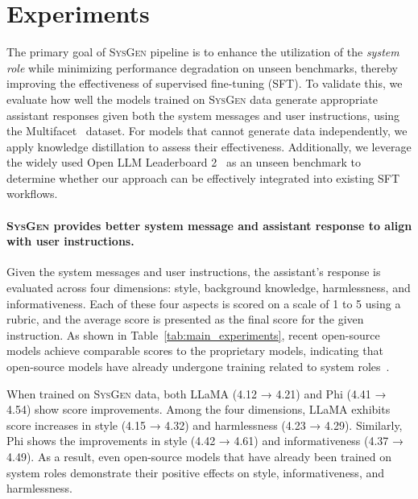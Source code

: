 
\section{Experiments}


The primary goal of \textsc{SysGen} pipeline is to enhance the utilization of the \emph{system role} while minimizing performance degradation on unseen benchmarks, thereby improving the effectiveness of supervised fine-tuning (SFT).
To validate this, we evaluate how well the models trained on \textsc{SysGen} data generate appropriate assistant responses given both the system messages and user instructions, using the Multifacet~\citep{lee2024aligning} dataset.
For models that cannot generate data independently, we apply knowledge distillation to assess their effectiveness.
Additionally, we leverage the widely used Open LLM Leaderboard 2~\citep{myrzakhan2024open} as an unseen benchmark to determine whether our approach can be effectively integrated into existing SFT workflows.


\paragraph{\textsc{SysGen} provides better system message and assistant response to align with user instructions.}
Given the system messages and user instructions, the assistant's response is evaluated across four dimensions: style, background knowledge, harmlessness, and informativeness.
Each of these four aspects is scored on a scale of 1 to 5 using a rubric, and the average score is presented as the final score for the given instruction.
As shown in Table~\ref{tab:main_experiments}, recent open-source models achieve comparable scores to the proprietary models, indicating that open-source models have already undergone training related to system roles~\citep{meta2024introducing, yang2024qwen2, abdin2024phi}.

When trained on \textsc{SysGen} data, both LLaMA (4.12 → 4.21) and Phi (4.41 → 4.54) show score improvements.
Among the four dimensions, LLaMA exhibits score increases in style (4.15 → 4.32) and harmlessness (4.23 → 4.29).
Similarly, Phi shows the improvements in style (4.42 → 4.61) and informativeness (4.37 → 4.49).
As a result, even open-source models that have already been trained on system roles demonstrate their positive effects on style, informativeness, and harmlessness.




